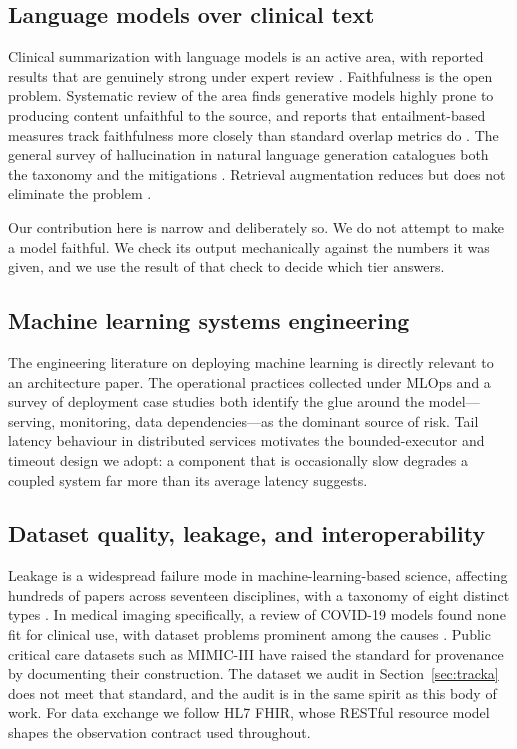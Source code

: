 \documentclass[lettersize,journal]{IEEEtran}
\begin{document}
\subsection{Language models over clinical text}

Clinical summarization with language models is an active area, with reported
results that are genuinely strong under expert review \cite{vanveen2024}.
Faithfulness is the open problem. Systematic review of the area finds
generative models highly prone to producing content unfaithful to the source,
and reports that entailment-based measures track faithfulness more closely than
standard overlap metrics do \cite{huang2025}. The general survey of
hallucination in natural language generation catalogues both the taxonomy and
the mitigations \cite{ji2023}. Retrieval augmentation reduces but does not
eliminate the problem \cite{peng2025}.

Our contribution here is narrow and deliberately so. We do not attempt to make a
model faithful. We check its output mechanically against the numbers it was
given, and we use the result of that check to decide which tier answers.

\subsection{Machine learning systems engineering}

The engineering literature on deploying machine learning is directly relevant to
an architecture paper. The operational practices collected under MLOps
\cite{kreuzberger2023} and a survey of deployment case studies \cite{paleyes2022}
both identify the glue around the model---serving, monitoring, data
dependencies---as the dominant source of risk. Tail latency behaviour in
distributed services \cite{dean2013} motivates the bounded-executor and
timeout design we adopt: a component that is occasionally slow degrades a
coupled system far more than its average latency suggests.

\subsection{Dataset quality, leakage, and interoperability}

Leakage is a widespread failure mode in machine-learning-based science,
affecting hundreds of papers across seventeen disciplines, with a taxonomy of
eight distinct types \cite{kapoor2023}. In medical imaging specifically, a
review of COVID-19 models found none fit for clinical use, with dataset problems
prominent among the causes \cite{roberts2021}. Public critical care datasets such
as MIMIC-III \cite{johnson2016} have raised the standard for provenance by
documenting their construction. The dataset we audit in
Section~\ref{sec:tracka} does not meet that standard, and the audit is in the
same spirit as this body of work. For data exchange we follow HL7 FHIR, whose
RESTful resource model \cite{saripalle2019} shapes the observation contract used
throughout.
\end{document}
